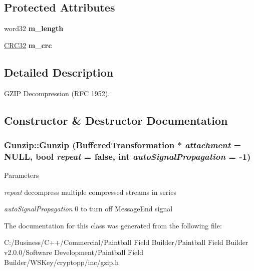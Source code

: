 \subsection*{Protected Attributes}
\begin{DoxyCompactItemize}
\item 
\hypertarget{class_gunzip_acc88661126feb496126224c5157b387a}{
word32 {\bfseries m\_\-length}}
\label{class_gunzip_acc88661126feb496126224c5157b387a}

\item 
\hypertarget{class_gunzip_ae59bb25e5259b983acf79188199d595d}{
\hyperlink{class_c_r_c32}{CRC32} {\bfseries m\_\-crc}}
\label{class_gunzip_ae59bb25e5259b983acf79188199d595d}

\end{DoxyCompactItemize}


\subsection{Detailed Description}
GZIP Decompression (RFC 1952). 

\subsection{Constructor \& Destructor Documentation}
\hypertarget{class_gunzip_a30ad6514a475206a6b60ccf81693323b}{
\subsubsection[{Gunzip}]{\setlength{\rightskip}{0pt plus 5cm}Gunzip::Gunzip ({\bf BufferedTransformation} $\ast$ {\em attachment} = {\ttfamily NULL}, \/  bool {\em repeat} = {\ttfamily false}, \/  int {\em autoSignalPropagation} = {\ttfamily -\/1})}}
\label{class_gunzip_a30ad6514a475206a6b60ccf81693323b}

\begin{DoxyParams}{Parameters}
\item[{\em repeat}]decompress multiple compressed streams in series \item[{\em autoSignalPropagation}]0 to turn off MessageEnd signal \end{DoxyParams}


The documentation for this class was generated from the following file:\begin{DoxyCompactItemize}
\item 
C:/Business/C++/Commercial/Paintball Field Builder/Paintball Field Builder v2.0.0/Software Development/Paintball Field Builder/WSKey/cryptopp/inc/gzip.h\end{DoxyCompactItemize}
